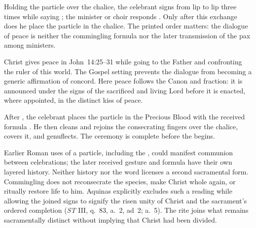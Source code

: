 Holding the particle over the chalice, the celebrant signs from lip to lip three times while saying ; the minister or choir responds . Only after this exchange does he place the particle in the chalice. The printed order matters: the dialogue of peace is neither the commingling formula nor the later transmission of the pax among ministers.

Christ gives peace in John~14:25--31 while going to the Father and confronting the ruler of this world. The Gospel setting prevents the dialogue from becoming a generic affirmation of concord. Here peace follows the Canon and fraction: it is announced under the signs of the sacrificed and living Lord before it is enacted, where appointed, in the distinct kiss of peace.


After , the celebrant places the particle in the Precious Blood with the received formula . He then cleans and rejoins the consecrating fingers over the chalice, covers it, and genuflects. The ceremony is complete before the  begins.

Earlier Roman uses of a particle, including the , could manifest communion between celebrations; the later received gesture and formula have their own layered history. Neither history nor the word  licenses a second sacramental form. Commingling does not reconsecrate the species, make Christ whole again, or ritually restore life to him. Aquinas explicitly excludes such a reading while allowing the joined signs to signify the risen unity of Christ and the sacrament's ordered completion (\emph{ST} III, q.~83, a.~2, ad~2; a.~5). The rite joins what remains sacramentally distinct without implying that Christ had been divided.


